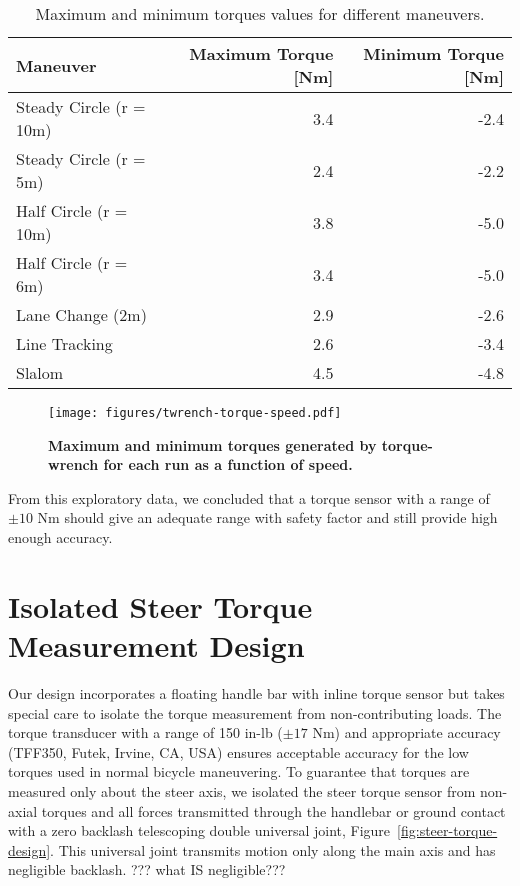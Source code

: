 \documentclass[10pt]{article}
\begin{document}
\begin{table}
  \caption{Maximum and minimum torques values for different maneuvers.}
  \begin{tabular}{lrr}
    \toprule
    Maneuver & Maximum Torque [Nm] & Minimum Torque [Nm] \\
    \midrule
    Steady Circle (r = 10m) & 3.4 & -2.4 \\
    Steady Circle (r = 5m) & 2.4 & -2.2 \\
    Half Circle (r = 10m) & 3.8 & -5.0 \\
    Half Circle (r = 6m) & 3.4 & -5.0 \\
    Lane Change (2m) & 2.9 & -2.6 \\
    Line Tracking & 2.6 & -3.4 \\
    Slalom & 4.5 & -4.8 \\
    \bottomrule
  \end{tabular}
  \label{tab:maneuver-torque-values}
\end{table}

\begin{figure}
  \centering
  \texttt{[image: figures/twrench-torque-speed.pdf]}
  \caption{{\bf Maximum  and minimum torques generated by torque-wrench for each run as a function of speed.}
    }
  \label{fig:twrench-torque-speed}
\end{figure}

From this exploratory data, we concluded that a torque sensor with a range of $\pm10$ Nm
should give an adequate range with safety factor and still provide high
enough accuracy.

\section*{Isolated Steer Torque Measurement Design}

Our design incorporates a floating handle bar with inline torque sensor but
takes special care to isolate the torque measurement from non-contributing
loads. The torque transducer with a range of 150 in-lb ($\pm 17$ Nm) and appropriate accuracy 
(TFF350, Futek, Irvine, CA, USA) ensures acceptable accuracy for the low torques used in normal
bicycle maneuvering. To guarantee that torques are measured only about the
steer axis, we isolated the steer torque sensor from non-axial
torques and all forces transmitted through the handlebar or ground contact with
a zero backlash telescoping double universal joint,
Figure~\ref{fig:steer-torque-design}. This universal joint  transmits motion only
along the main axis and has negligible backlash. ??? what IS negligible???
\end{document}
